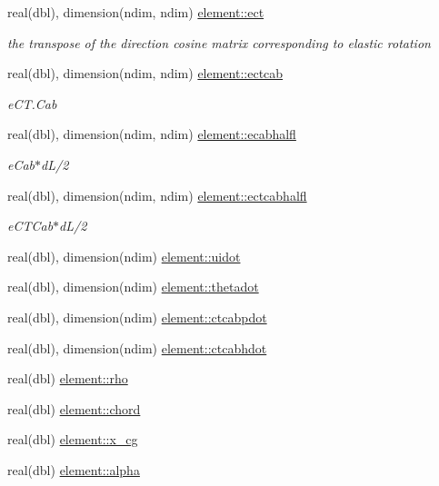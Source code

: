 \begin{DoxyCompactItemize}
real(dbl), dimension(ndim, ndim) \hyperlink{namespaceelement_a355b3273dce5e581cf75d079f4f4557d}{element\+::ect}
\begin{DoxyCompactList}\small\item\em the transpose of the direction cosine matrix corresponding to elastic rotation \end{DoxyCompactList}\item 
real(dbl), dimension(ndim, ndim) \hyperlink{namespaceelement_a94c9e7eb21bc71af7de19ee37093b959}{element\+::ectcab}
\begin{DoxyCompactList}\small\item\em e\+C\+T.\+Cab \end{DoxyCompactList}\item 
real(dbl), dimension(ndim, ndim) \hyperlink{namespaceelement_af027b6db49efde36e310bc9e4f8e0d06}{element\+::ecabhalfl}
\begin{DoxyCompactList}\small\item\em e\+Cab$\ast$d\+L/2 \end{DoxyCompactList}\item 
real(dbl), dimension(ndim, ndim) \hyperlink{namespaceelement_afa3adc34db2cdcd479dd21a3873ef5d1}{element\+::ectcabhalfl}
\begin{DoxyCompactList}\small\item\em e\+C\+T\+Cab$\ast$d\+L/2 \end{DoxyCompactList}\item 
real(dbl), dimension(ndim) \hyperlink{namespaceelement_a0ceabdb65183ba09653081ad8ca4259d}{element\+::uidot}
\item 
real(dbl), dimension(ndim) \hyperlink{namespaceelement_a7404d160f35ff4cfc4ea3e3d8f76cb89}{element\+::thetadot}
\item 
real(dbl), dimension(ndim) \hyperlink{namespaceelement_a8dd69dbb67c325d43811863c2f95e9e0}{element\+::ctcabpdot}
\item 
real(dbl), dimension(ndim) \hyperlink{namespaceelement_a4afdc10a9e39215ab6c7d03fe10a4473}{element\+::ctcabhdot}
\item 
real(dbl) \hyperlink{namespaceelement_a3c256e3e6f1a658f469f77ed8f7d033e}{element\+::rho}
\item 
real(dbl) \hyperlink{namespaceelement_a55d26e2f0da1242eeb9cc8d3d589f1e5}{element\+::chord}
\item 
real(dbl) \hyperlink{namespaceelement_aa46e16e8787633edb4e4c0c8c6809ecb}{element\+::x\+\_\+cg}
\item 
real(dbl) \hyperlink{namespaceelement_aa45829429fe33aa2b5cd6feaacc2c739}{element\+::alpha}

\end{DoxyCompactItemize}
